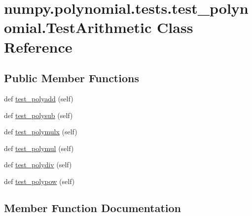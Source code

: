 \hypertarget{classnumpy_1_1polynomial_1_1tests_1_1test__polynomial_1_1TestArithmetic}{}\section{numpy.\+polynomial.\+tests.\+test\+\_\+polynomial.\+Test\+Arithmetic Class Reference}
\label{classnumpy_1_1polynomial_1_1tests_1_1test__polynomial_1_1TestArithmetic}
\subsection*{Public Member Functions}
\begin{DoxyCompactItemize}
\item 
def \hyperlink{classnumpy_1_1polynomial_1_1tests_1_1test__polynomial_1_1TestArithmetic_a11662ddf30472f46fd87d262892493d2}{test\+\_\+polyadd} (self)
\item 
def \hyperlink{classnumpy_1_1polynomial_1_1tests_1_1test__polynomial_1_1TestArithmetic_aed2bacc7bd878eceb188c3c15594c2c0}{test\+\_\+polysub} (self)
\item 
def \hyperlink{classnumpy_1_1polynomial_1_1tests_1_1test__polynomial_1_1TestArithmetic_a4ac90550eb2435ca6072860431618898}{test\+\_\+polymulx} (self)
\item 
def \hyperlink{classnumpy_1_1polynomial_1_1tests_1_1test__polynomial_1_1TestArithmetic_a2f6ce10298bba35488c9b1dbd44ead1a}{test\+\_\+polymul} (self)
\item 
def \hyperlink{classnumpy_1_1polynomial_1_1tests_1_1test__polynomial_1_1TestArithmetic_a3b58ad68f1196b226fa29f7f8d88b715}{test\+\_\+polydiv} (self)
\item 
def \hyperlink{classnumpy_1_1polynomial_1_1tests_1_1test__polynomial_1_1TestArithmetic_a30c6b4cd8afeda28466a3877c34e1a7a}{test\+\_\+polypow} (self)
\end{DoxyCompactItemize}


\subsection{Member Function Documentation}
\mbox{\label{classnumpy_1_1polynomial_1_1tests_1_1test__polynomial_1_1TestArithmetic_a11662ddf30472f46fd87d262892493d2}} 
